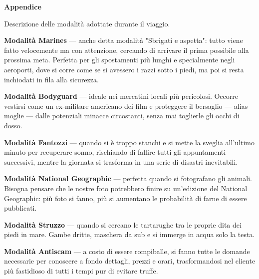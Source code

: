 \begin{center}
    {\large \textbf{Appendice}}
\end{center}

\noindent \newline \newline

Descrizione delle modalità adottate durante il viaggio. 
\newline
\newline

\textbf{Modalità Marines} — anche detta modalità "Sbrigati e aspetta": tutto viene fatto velocemente ma con attenzione, cercando di arrivare il prima possibile alla prossima meta. Perfetta per gli spostamenti più lunghi e specialmente negli aeroporti, dove si corre come se si avessero i razzi sotto i piedi, ma poi si resta inchiodati in fila alla sicurezza.
\newline

\textbf{Modalità Bodyguard} — ideale nei mercatini locali più pericolosi. Occorre vestirsi come un ex-militare americano dei film e proteggere il bersaglio — alias moglie — dalle potenziali minacce circostanti, senza mai toglierle gli occhi di dosso.
\newline

\textbf{Modalità Fantozzi} — quando si è troppo stanchi e si mette la sveglia all'ultimo minuto per recuperare sonno, rischiando di fallire tutti gli appuntamenti successivi, mentre la giornata si trasforma in una serie di disastri inevitabili.
\newline

\textbf{Modalità National Geographic} — perfetta quando si fotografano gli animali. Bisogna pensare che le nostre foto potrebbero finire su un'edizione del National Geographic: più foto si fanno, più si aumentano le probabilità di farne di essere pubblicati.
\newline

\textbf{Modalità Struzzo} — quando si cercano le tartarughe tra le proprie dita dei piedi in mare. Gambe dritte, maschera da sub e si immerge in acqua solo la testa.
\newline

\textbf{Modalità Antiscam} — a costo di essere rompiballe, si fanno tutte le domande necessarie per conoscere a fondo dettagli, prezzi e orari, trasformandosi nel cliente più fastidioso di tutti i tempi pur di evitare truffe.
\newline